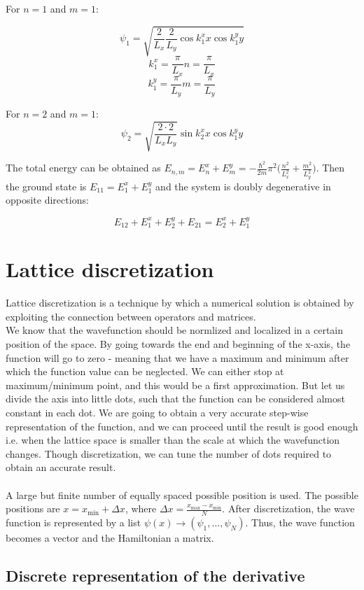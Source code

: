   For $n=1$ and $m=1$:

  $$\psi_1 = \sqrt{\frac{2}{L_{x}}\frac{2}{L_{y}} \cos k_1^x x \cos k_1^y y}$$
  $$k_1^x = \frac{\pi}{L_{x}} n = \frac{\pi}{L_{x}}$$
  $$k_1^y = \frac{\pi}{L_{y}} m = \frac{\pi}{L_{y}}$$

  For $n=2$ and $m=1$:
  $$\psi_2 = \sqrt{\frac{2 \cdot 2}{L_{x}L_{y}}} \sin k_2^x x \cos k_1^y y$$

  The total energy can be obtained as $E_{n,m} = E_n^x+E_m^y = -\frac{\hbar^2}{2m}\pi^2\biggl(\frac{n^2}{L_x^2}+\frac{m^2}{L_y^2}\biggr)$.
  Then the ground state is $E_{11} = E_1^x+E_1^y$ and the system is doubly degenerative in opposite directions:

  $$E_{12} + E_1^x+E_2^y + E_{21} = E_2^x+E_1^y$$

\section{Lattice discretization}
Lattice discretization is a technique by which a numerical solution is obtained by exploiting the connection between operators and matrices.\\

\noindent
We know that the wavefunction should be normlized and localized in a certain position of the space. By going towards the end and beginning of the x-axis, the function will go to zero - meaning that we have a maximum and minimum after which the function value can be neglected. We can either stop at maximum/minimum point, and this would be a first approximation. But let us divide the axis into little dots, such that the function can be considered almost constant in each dot. We are going to obtain a very accurate step-wise representation of the function,  and we can proceed until the result is good enough i.e. when the lattice space is smaller than the scale at which the wavefunction changes. Though discretization, we can tune the number of dots required to obtain an accurate result.\\
\\
\noindent
A large but finite number of equally spaced possible position is used. The possible positions are $x = x_{\min} + \Delta x$, where $\Delta x = \frac{x_{\max}-x_{\min}}{N}$.
After discretization, the wave function is represented by a list $\psi(x) \rightarrow(\psi_1,\dots, \psi_N)$.
Thus, the wave function becomes a vector and the Hamiltonian a matrix.

  \subsection{Discrete representation of the derivative}

